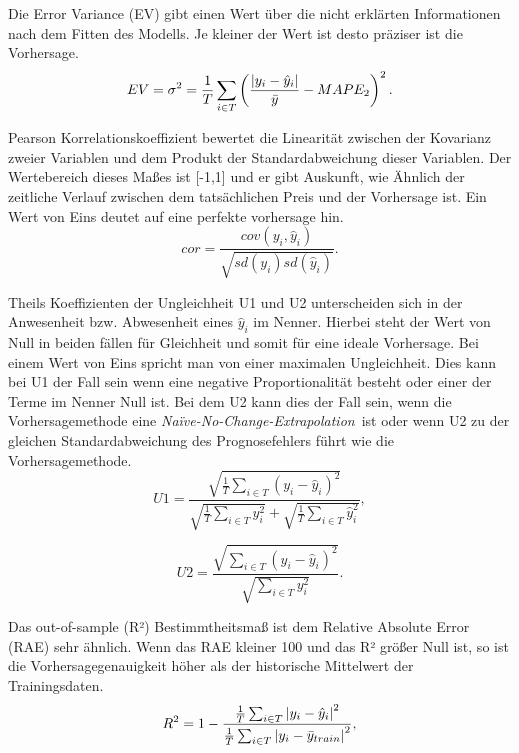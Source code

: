 Die Error Variance (EV) gibt einen Wert über die nicht erklärten Informationen nach dem Fitten des Modells. Je kleiner der Wert ist desto präziser ist die Vorhersage.\,
\begin{equation}
EV= \sigma^2 = \frac{1}{T} \sum\limits_{i \in T} \left ( \frac{\abs{y_i-\hat{y}_i}}{\bar{y}} - MAPE_2  \right ) ^2.
\label{gl:EV}
\end{equation}

Pearson Korrelationskoeffizient bewertet die Linearität zwischen der Kovarianz zweier Variablen und dem Produkt der Standardabweichung dieser Variablen. Der Wertebereich dieses Maßes ist [-1,1] und er gibt Auskunft, wie Ähnlich der zeitliche Verlauf zwischen dem tatsächlichen Preis und der Vorhersage ist. Ein Wert von Eins deutet auf eine perfekte vorhersage hin.\, 
\begin{equation}
cor = \frac{cov(y_i,\hat{y}_i)}{\sqrt{sd(y_i)sd(\hat{y}_i)}} .
\label{gl:cor}
\end{equation}


Theils Koeffizienten der Ungleichheit U1 und U2 unterscheiden sich in der Anwesenheit bzw. Abwesenheit eines $\hat{y}_i$ im Nenner. Hierbei steht der Wert von Null in beiden fällen für Gleichheit und somit für eine ideale Vorhersage. Bei einem Wert von Eins spricht man von einer maximalen Ungleichheit. Dies kann bei U1 der Fall sein wenn eine negative Proportionalität besteht oder einer der Terme im Nenner Null ist. Bei dem U2 kann dies der Fall sein, wenn die Vorhersagemethode eine \textit{Na\"{i}ve-No-Change-Extrapolation}\, ist oder wenn U2 zu der gleichen Standardabweichung des Prognosefehlers führt wie die Vorhersagemethode.\,
\begin{equation}
U1 = \frac{\sqrt{\frac{1}{T} \sum_{i \in T} (y_i-\hat{y}_i)^2}}{ \sqrt{\frac{1}{T} \sum_{i \in T} y_i^2} + \sqrt{\frac{1}{T} \sum_{i \in T} \hat{y}_i^2}},
\label{gl:U1}
\end{equation}

\begin{equation}
U2 = \frac{\sqrt{\sum_{i \in T} (y_i-\hat{y}_i)^2}}{ \sqrt{ \sum_{i \in T} y_i^2} }.
\label{gl:U2}
\end{equation}


Das out-of-sample (R²) Bestimmtheitsmaß ist dem Relative Absolute Error (RAE) sehr ähnlich. Wenn das RAE kleiner 100 und das R² größer Null ist, so ist die Vorhersagegenauigkeit höher als der historische Mittelwert der Trainingsdaten.
\begin{equation}
R^2 = 1 -  \frac{\frac{1}{T} \sum_{i \in T} \abs{y_i-\hat{y}_i}^2}{ \frac{1}{T} \sum_{i \in T} \abs{y_i-\bar{y}_{train}}^2 } ,
\label{gl:R2}
\end{equation}


